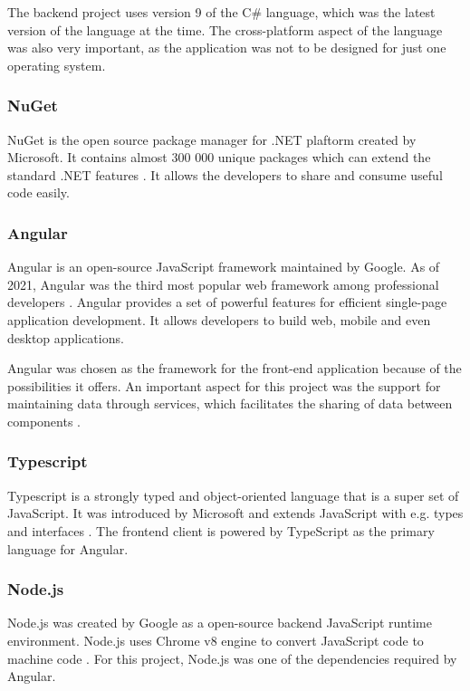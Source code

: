 \documentclass[a4paper,twoside,12pt]{book}
\begin{document}
The backend project uses version 9 of the C\# language, which was the latest version of the language at the time. The cross-platform aspect of the language was also very important, as the application was not to be designed for just one operating system. 

\subsubsection{NuGet}
NuGet is the open source package manager for .NET plaftorm created by Microsoft. It contains almost 300 000 unique packages which can extend the standard .NET features \cite{bib:nuget}. It allows the developers to share and consume useful code easily.

\subsubsection{Angular}
Angular is an open-source JavaScript framework maintained by Google. As of 2021, Angular was the third most popular web framework among professional developers \cite{bib:stackSurvey}. Angular provides a set of powerful features for efficient single-page application development. It allows developers to build web, mobile and even desktop applications.

Angular was chosen as the framework for the front-end application because of the possibilities it offers. An important aspect for this project was the support for maintaining data through services, which facilitates the sharing of data between components \cite{bib:angular}.

\subsubsection{Typescript}
Typescript is a strongly typed and object-oriented language that is a super set of JavaScript. It was introduced by Microsoft and extends JavaScript with e.g. types and interfaces \cite{bib:typescript}. The frontend client is powered by TypeScript as the primary language for Angular.

\subsubsection{Node.js}
Node.js was created by Google as a open-source backend JavaScript runtime environment. Node.js uses Chrome v8 engine to convert JavaScript code to machine code \cite{bib:nodeJs}. For this project, Node.js was one of the dependencies required by Angular.
\end{document}
